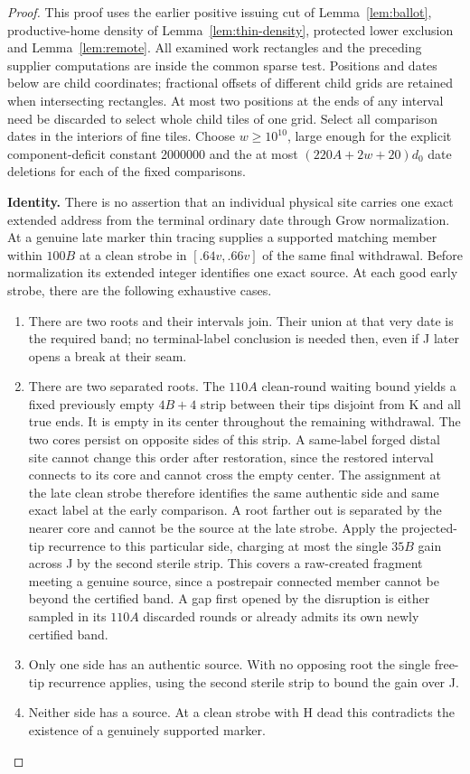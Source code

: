 \begin{proof}
This proof uses the earlier positive issuing cut of Lemma~\ref{lem:ballot}, productive-home density of Lemma~\ref{lem:thin-density}, protected lower exclusion and Lemma~\ref{lem:remote}. All examined work rectangles and the preceding supplier computations are inside the common sparse test. Positions and dates below are child coordinates; fractional offsets of different child grids are retained when intersecting rectangles. At most two positions at the ends of any interval need be discarded to select whole child tiles of one grid. Select all comparison dates in the interiors of fine tiles. Choose \(w\ge 10^{10}\), large enough for the explicit component-deficit constant 2000000 and the at most \((220A+2w+20)d_0\) date deletions for each of the fixed comparisons.

\textbf{Identity.} There is no assertion that an individual physical site carries one exact extended address from the terminal ordinary date through Grow normalization. At a genuine late marker thin tracing supplies a supported matching member within \(100B\) at a clean strobe in \([.64v,.66v]\) of the same final withdrawal. Before normalization its extended integer identifies one exact source. At each good early strobe, there are the following exhaustive cases.

\begin{enumerate}
\item There are two roots and their intervals join. Their union at that very date is the required band; no terminal-label conclusion is needed then, even if J later opens a break at their seam.
\item There are two separated roots. The \(110A\) clean-round waiting bound yields a fixed previously empty \(4B+4\) strip between their tips disjoint from K and all true ends. It is empty in its center throughout the remaining withdrawal. The two cores persist on opposite sides of this strip. A same-label forged distal site cannot change this order after restoration, since the restored interval connects to its core and cannot cross the empty center. The assignment at the late clean strobe therefore identifies the same authentic side and same exact label at the early comparison. A root farther out is separated by the nearer core and cannot be the source at the late strobe. Apply the projected-tip recurrence to this particular side, charging at most the single \(35B\) gain across J by the second sterile strip. This covers a raw-created fragment meeting a genuine source, since a postrepair connected member cannot be beyond the certified band. A gap first opened by the disruption is either sampled in its \(110A\) discarded rounds or already admits its own newly certified band.
\item Only one side has an authentic source. With no opposing root the single free-tip recurrence applies, using the second sterile strip to bound the gain over J.
\item Neither side has a source. At a clean strobe with H dead this contradicts the existence of a genuinely supported marker.


\end{enumerate}
\end{proof}
